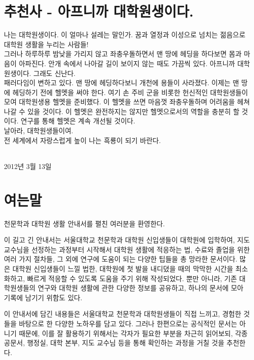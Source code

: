 \chapter{추천사 - 아프니까 대학원생이다.}

나는 대학원생이다. 
이 얼마나 설레는 말인가. 
꿈과 열정과 이성으로 넘치는 젊음으로 대학원 생활을 누리는 사람들! \\

그러나 하루하루 밤낮을 가리지 않고 좌충우돌하면서 맨 땅에 헤딩을 하다보면 몸과 마음이 아파진다. 안개 속에서 나아갈 길이 보이지 않는 때도 가끔씩 있다. 아프니까 대학원생이다. 그래도 신난다.\\

패러다임이 변하고 있다. 맨 땅에 헤딩하다보니 개천에 용들이 사라졌다. 이제는 맨 땅에 헤딩하기 전에 헬멧을 써야 한다. 여기 손 주비 군을 비롯한 헌신적인 대학원생들이 모여 대학원생용 헬멧을 준비했다. 이 헬멧을 쓰면 마음껏 좌충우돌하며 어려움을 헤쳐 나갈 수 있을 것이다. 이 헬멧은 완전하지는 않지만 헬멧으로서의 역할을 충분히 할 것이다. 연구를 통해 헬멧은 계속 개선될 것이다.\\

날아라, 대학원생들이여.\\
전 세계에서 자랑스럽게 높이 나는 흑룡이 되기 바란다.   

{ \\ 2012년 3월 13일\par}

\chapter{여는말}
천문학과 대학원 생활 안내서를 펼친 여러분을 환영한다.

 이 길고 긴 안내서는 서울대학교 천문학과 대학원 신입생들이 대학원에 입학하여, 지도 교수님을 선정하는 과정부터 시작해서 대학원 생활에 적응하는 법, 수료와 졸업을 위한 여러 가지 절차들, 그 외에 연구에 도움이 되는 다양한 팁들을 총 망라한 문서이다. 많은 대학원 신입생들이 느낄 법한, 대학원에 첫 발을 내디뎠을 때의 막막한 시간을 최소화하고, 빠르게 적응할 수 있도록 도움을 주기 위해 작성되었다. 뿐만 아니라, 기존 대학원생들의 연구와 대학원 생활에 관한 다양한 정보를 공유하고, 하나의 문서에 모아 기록에 남기기 위함도 있다. 

 이 안내서에 담긴 내용들은 서울대학교 천문학과 대학원생들이 직접 느끼고, 경험한 것들을 바탕으로 한 다양한 노하우를 담고 있다. 그러나 한편으로는 공식적인 문서는 아니기 때문에, 이를 잘 활용하기 위해서는 각자가 필요한 부분을 차근히 읽어보되, 각종 공문서, 행정실, 대학 본부, 지도 교수님 등을 통해 확인하는 과정을 거칠 것을 추천한다. 

